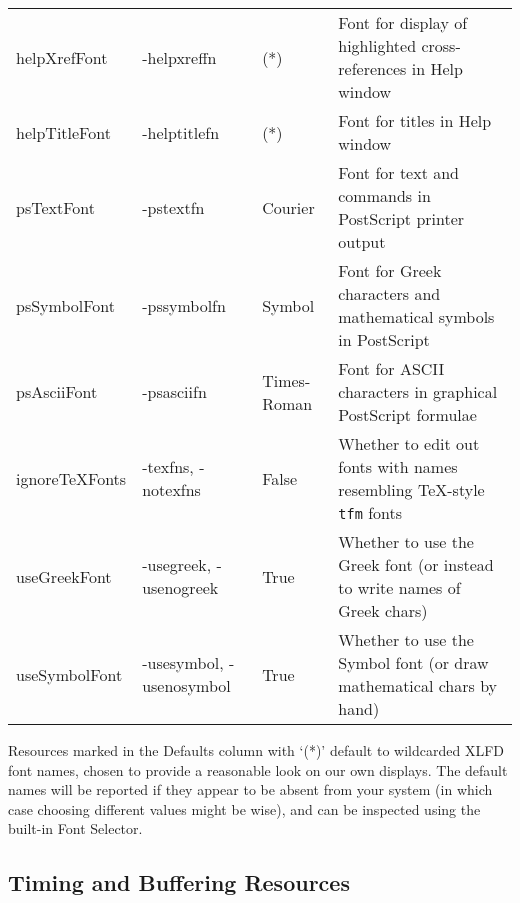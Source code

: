 {{\begin{tabular}{l p{1in} l p{2.5in}}
helpXrefFont &-helpxreffn &{\rm (*)} &{\rm
Font for display of highlighted cross-references in Help window}\\

helpTitleFont &-helptitlefn &{\rm (*)} &{\rm
Font for titles in Help window}\\

psTextFont &-pstextfn &Courier &{\rm
Font for text and commands in PostScript printer output}\\

psSymbolFont &-pssymbolfn &Symbol &{\rm
Font for Greek characters and mathematical symbols in PostScript}\\

psAsciiFont &-psasciifn &Times-Roman &{\rm
Font for ASCII characters in graphical PostScript formulae}\\

ignoreTeXFonts &-texfns, -notexfns &False &{\rm
Whether to edit out fonts with names resembling \TeX-style {\tt tfm} fonts}\\

useGreekFont &-usegreek, -usenogreek &True &{\rm
Whether to use the Greek font (or instead to write names of Greek chars)}\\

useSymbolFont &-usesymbol, -usenosymbol &True &{\rm
Whether to use the Symbol font (or draw mathematical chars by hand)}

\end{tabular}
}

Resources marked in the Defaults column with `(*)' default to
wildcarded XLFD font names, chosen to provide a reasonable look on our
own displays.  The default names will be reported if they appear to be
absent from your system (in which case choosing different values might
be wise), and can be inspected using the built-in Font Selector.
}

\subsection{Timing and Buffering Resources}

